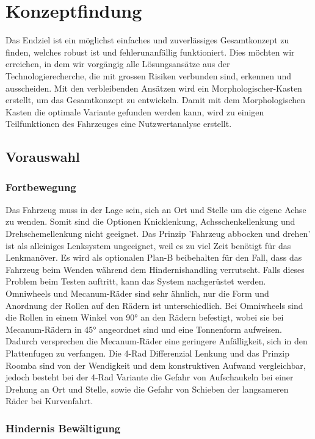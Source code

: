 \documentclass[../main.tex]{subfiles}
\begin{document}
\newpage
\section{Konzeptfindung}

Das Endziel ist ein möglichst einfaches und zuverlässiges Gesamtkonzept zu finden, welches robust ist und fehlerunanfällig funktioniert. Dies möchten wir erreichen, in dem wir vorgängig alle Lösungsansätze aus der Technologierecherche, die mit grossen Risiken verbunden sind, erkennen und ausscheiden. Mit den verbleibenden Ansätzen wird ein Morphologischer-Kasten erstellt, um das Gesamtkonzept zu entwickeln. Damit mit dem Morphologischen Kasten die optimale Variante gefunden werden kann, wird zu einigen Teilfunktionen des Fahrzeuges eine Nutzwertanalyse erstellt.

\subsection{Vorauswahl}
    \subsubsection{Fortbewegung}
    Das Fahrzeug muss in der Lage sein, sich an Ort und Stelle um die eigene Achse zu wenden. Somit sind die Optionen Knicklenkung, Achsschenkellenkung und Drehschemellenkung nicht geeignet.
    Das Prinzip 'Fahrzeug abbocken und drehen' ist als alleiniges Lenksystem ungeeignet, weil es zu viel Zeit benötigt für das Lenkmanöver. Es wird als optionalen Plan-B beibehalten für den Fall, dass das Fahrzeug beim Wenden während dem Hindernishandling verrutscht. Falls dieses Problem beim Testen auftritt, kann das System nachgerüstet werden.
    Omniwheels und Mecanum-Räder sind sehr ähnlich, nur die Form und Anordnung der Rollen auf den Rädern ist unterschiedlich. Bei Omniwheels sind die Rollen in einem Winkel von 90° an den Rädern befestigt, wobei sie bei Mecanum-Rädern in 45° angeordnet sind und eine Tonnenform aufweisen. Dadurch versprechen die Mecanum-Räder eine geringere Anfälligkeit, sich in den Plattenfugen zu verfangen. Die 4-Rad Differenzial Lenkung und das Prinzip Roomba sind von der Wendigkeit und dem konstruktiven Aufwand vergleichbar, jedoch besteht bei der 4-Rad Variante die Gefahr von Aufschaukeln bei einer Drehung an Ort und Stelle, sowie die Gefahr von Schieben der langsameren Räder bei Kurvenfahrt.
        
    \newpage
    \subsubsection{Hindernis Bewältigung}
\end{document}
